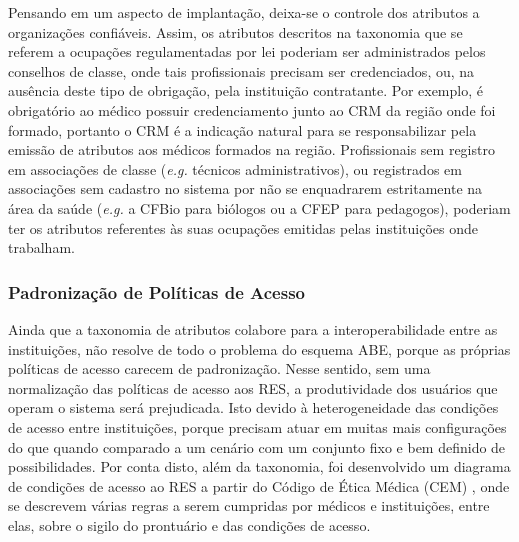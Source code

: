 \documentclass[a4paper,11pt]{article}
\begin{document}
Pensando em um aspecto de implantação, deixa-se o controle dos atributos a organizações confiáveis. Assim, os atributos descritos na taxonomia que se referem a ocupações regulamentadas por lei poderiam ser administrados pelos conselhos de classe, onde tais profissionais precisam ser credenciados, ou, na ausência deste tipo de obrigação, pela instituição contratante.
Por exemplo, é obrigatório ao médico possuir credenciamento junto ao CRM da região onde foi formado, portanto o CRM é a indicação natural para se responsabilizar pela emissão de atributos aos médicos formados na região.
Profissionais sem registro em associações de classe (\emph{e.g.} técnicos administrativos), ou registrados em associações sem cadastro no sistema por não se enquadrarem estritamente na área da saúde (\emph{e.g.} a CFBio para biólogos ou a CFEP para pedagogos), poderiam ter os atributos referentes às suas ocupações emitidas pelas instituições onde trabalham.


\subsubsection{Padronização de Políticas de Acesso}

Ainda que a taxonomia de atributos colabore para a interoperabilidade entre as instituições, não resolve de todo o problema do esquema ABE, porque as próprias políticas de acesso carecem de padronização. %
Nesse sentido, sem uma normalização das políticas de acesso aos RES, a produtividade dos usuários que operam o sistema será prejudicada. Isto devido à heterogeneidade das condições de acesso entre instituições, %
porque precisam atuar em muitas mais configurações do que quando comparado a um cenário com um conjunto fixo e bem definido de possibilidades.
Por conta disto, além da taxonomia, foi desenvolvido um diagrama de condições de acesso ao RES a partir do Código de Ética Médica (CEM) \cite{ConselhoFederaldeMedicina2019}, onde se descrevem várias regras a serem cumpridas por médicos e instituições, %
entre elas, sobre o sigilo do prontuário e das condições de acesso.
\end{document}
